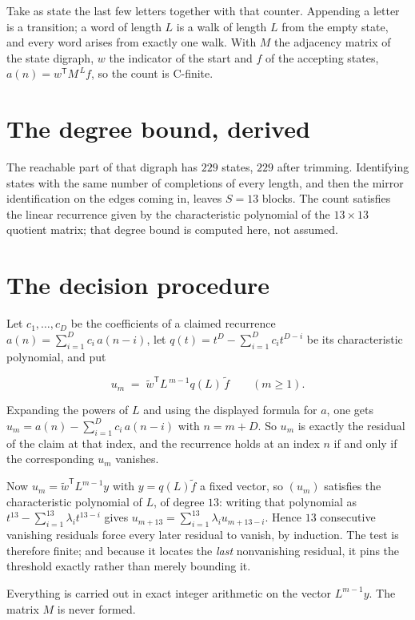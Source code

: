 \documentclass[11pt]{article}
\theoremstyle{definition}
\begin{document}
Take as state the last few letters together with that counter. Appending a letter is a transition; a word of length $L$ is a walk of length $L$ from the empty state, and every word arises from exactly one walk. With $M$ the adjacency matrix of the state digraph, $w$ the indicator of the start and $f$ of the accepting states, $a(n) = w^{\mathsf T}M^{\,L}f$, so the count is C-finite.

\section{The degree bound, derived}

The reachable part of that digraph has $229$ states, $229$ after trimming. Identifying states with the same number of completions of every length, and then the mirror identification on the edges coming in, leaves $S = 13$ blocks. The count satisfies the linear recurrence given by the characteristic polynomial of the $13\times13$ quotient matrix; that degree bound is computed here, not assumed.

\section{The decision procedure}

Let $c_1,\dots,c_D$ be the coefficients of a claimed recurrence $a(n) = \sum_{i=1}^{D} c_i\,a(n-i)$, let $q(t) = t^{D} - \sum_{i=1}^{D} c_i t^{D-i}$ be its characteristic polynomial, and put

\[u_m \;=\; \tilde w^{\mathsf T} L^{\,m-1} q(L)\,\tilde f \qquad (m \ge 1).\]

Expanding the powers of $L$ and using the displayed formula for $a$, one gets $u_m = a(n) - \sum_{i=1}^{D} c_i\,a(n-i)$ with $n = m + D$. So $u_m$ is exactly the residual of the claim at that index, and the recurrence holds at an index $n$ if and only if the corresponding $u_m$ vanishes.

Now $u_m = \tilde w^{\mathsf T} L^{m-1} y$ with $y = q(L)\tilde f$ a fixed vector, so $(u_m)$ satisfies the characteristic polynomial of $L$, of degree $13$: writing that polynomial as $t^{13} - \sum_{i=1}^{13} \lambda_i t^{13-i}$ gives $u_{m+13} = \sum_{i=1}^{13} \lambda_i u_{m+13-i}$. Hence $13$ consecutive vanishing residuals force every later residual to vanish, by induction. The test is therefore finite; and because it locates the {\itshape last} nonvanishing residual, it pins the threshold exactly rather than merely bounding it.

Everything is carried out in exact integer arithmetic on the vector $L^{m-1}y$. The matrix $M$ is never formed.
\end{document}
